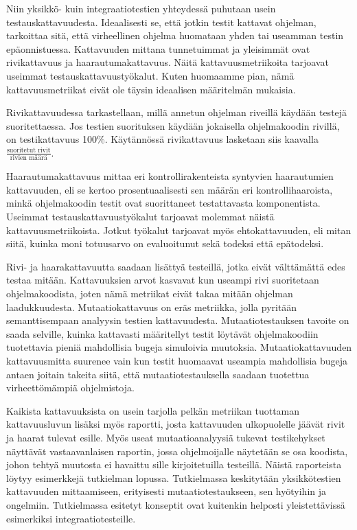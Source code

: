 \documentclass[finnish]{tktltiki2}
\begin{document}

Niin yksikkö- kuin integraatiotestien yhteydessä puhutaan usein testauskattavuudesta. Ideaalisesti se, että jotkin testit kattavat ohjelman, tarkoittaa sitä, että virheellinen ohjelma huomataan yhden tai useamman testin epäonnistuessa. Kattavuuden mittana tunnetuimmat ja yleisimmät ovat rivikattavuus ja haarautumakattavuus. Näitä kattavuusmetriikoita tarjoavat useimmat testauskattavuustyökalut. Kuten huomaamme pian, nämä kattavuusmetriikat eivät ole täysin ideaalisen määritelmän mukaisia.

Rivikattavuudessa tarkastellaan, millä annetun ohjelman riveillä käydään testejä suoritettaessa. Jos testien suorituksen käydään jokaisella ohjelmakoodin rivillä, on testikattavuus 100\%. Käytännössä rivikattavuus lasketaan siis kaavalla $\frac{\text{suoritetut rivit}}{\text{rivien määrä}}$.

Haarautumakattavuus mittaa eri kontrollirakenteista syntyvien haarautumien kattavuuden, eli se kertoo prosentuaalisesti sen määrän eri kontrollihaaroista, minkä ohjelmakoodin testit ovat suorittaneet testattavasta komponentista. Useimmat testauskattavuustyökalut tarjoavat molemmat näistä kattavuusmetriikoista. Jotkut työkalut tarjoavat myös ehtokattavuuden, eli mitan siitä, kuinka moni totuusarvo on evaluoitunut sekä todeksi että epätodeksi.

Rivi- ja haarakattavuutta saadaan lisättyä testeillä, jotka eivät välttämättä edes testaa mitään. Kattavuuksien arvot kasvavat kun useampi rivi suoritetaan ohjelmakoodista, joten nämä metriikat eivät takaa mitään ohjelman laadukkuudesta. Mutaatiokattavuus on eräs metriikka, jolla pyritään semanttisempaan analyysin testien kattavuudesta. Mutaatiotestauksen tavoite on saada selville, kuinka kattavasti määritellyt testit löytävät ohjelmakoodiin tuotettavia pieniä mahdollisia bugeja simuloivia muutoksia. Mutaatiokattavuuden kattavuusmitta suurenee vain kun testit huomaavat useampia mahdollisia bugeja antaen joitain takeita siitä, että mutaatiotestauksella saadaan tuotettua virheettömämpiä ohjelmistoja.

Kaikista kattavuuksista on usein tarjolla pelkän metriikan tuottaman kattavuusluvun lisäksi myös raportti, josta kattavuuden ulkopuolelle jäävät rivit ja haarat tulevat esille. Myös useat mutaatioanalyysiä tukevat testikehykset näyttävät vastaavanlaisen raportin, jossa ohjelmoijalle näytetään se osa koodista, johon tehtyä muutosta ei havaittu sille kirjoitetuilla testeillä. Näistä raporteista löytyy esimerkkejä tutkielman lopussa. Tutkielmassa keskitytään yksikkötestien kattavuuden mittaamiseen, erityisesti mutaatiotestaukseen, sen hyötyihin ja ongelmiin. Tutkielmassa esitetyt konseptit ovat kuitenkin helposti yleistettävissä esimerkiksi integraatiotesteille.
\end{document}
